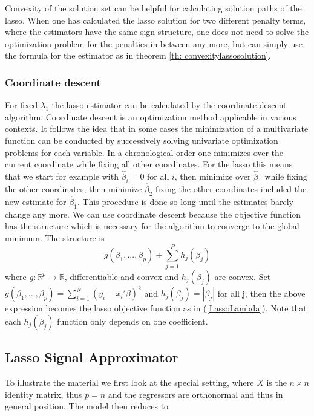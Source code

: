 \documentclass{article}
\theoremstyle{definition}
\begin{document}
Convexity of the solution set can be helpful for calculating solution paths of the lasso. When one has calculated the lasso solution for two different penalty terms, where the estimators have the same sign structure, one does not need to solve the optimization problem for the penalties in between any more, but can simply use the formula for the estimator as in theorem \eqref{th: convexitylassosolution}.

\subsubsection{Coordinate descent} \label{Sec: Coordinate Lasso}
For fixed $\lambda_1$ the lasso estimator can be calculated by the coordinate descent algorithm.
Coordinate descent is an optimization method applicable in various contexts. It follows the idea that in some cases the minimization of a multivariate function can be conducted by successively solving univariate optimization problems for each variable. In a chronological order one minimizes over the current coordinate while fixing all other coordinates. For the lasso this means that we start for example with $\hat{\beta}_i =0$ for all $i$, then minimize over $\hat{\beta}_1$ while fixing the other coordinates, then minimize $\hat{\beta}_2$ fixing the other coordinates included the new estimate for $\hat{\beta}_1$. This procedure is done so long until the estimates barely change any more.
We can use coordinate descent because the objective function has the structure which is necessary for the algorithm to converge to the global minimum. The structure is
\begin{equation}
g(\beta_1,...,\beta_p)+\sum_{j=1}^Ph_j(\beta_j) \nonumber
\end{equation}
where $g: \mathbb{R}^p \to \mathbb{R}$, differentiable and convex and $h_j(\beta_j)$ are convex. Set $g(\beta_1,...,\beta_p)=\sum_{i=1}^{N}(y_{i}-x_{i}'\beta)^2$ and $h_j(\beta_j)=|\beta_j|$ for all j, then the above expression becomes the lasso objective function as in (\ref{LassoLambda}). Note that each $h_j(\beta_j)$ function only depends on one coefficient.
\cite[chapter 5]{sparsity}

\subsection{Lasso Signal Approximator}

To illustrate the material we first look at the special setting, where $X$ is the $n \times n$ identity matrix, thus $p=n$ and the regressors are orthonormal and thus in general position. The model then reduces to
\end{document}
